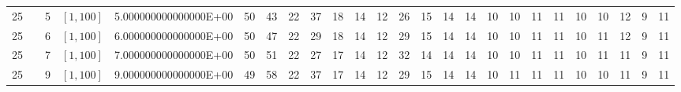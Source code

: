 \documentclass{article}
\begin{document}
\begin{landscape}
\begin{longtable}{ccccccccccccccccccccccccc}
  25 &  & 5          & $[1,100]$ & 5.000000000000000E+00 & \cellcolor{red!75} 50        &\cellcolor{red!5} 43        &\cellcolor{red!5} 22        &\cellcolor{red!5} 37        &\cellcolor{red!5} 18        &\cellcolor{green!5} 14        &\cellcolor{green!5} 12        &\cellcolor{red!5} 26        &15        &\cellcolor{green!5} 14        &\cellcolor{green!5} 14        &\cellcolor{green!5} 10        &\cellcolor{green!5} 10        &\cellcolor{green!5} 11        &\cellcolor{green!5} 11        &\cellcolor{green!5} 10        &\cellcolor{green!5} 10        &\cellcolor{green!5} 12        &\cellcolor{green!75} 9         &\cellcolor{green!5} 11\\
  25 &  & 6          & $[1,100]$ & 6.000000000000000E+00 & \cellcolor{red!75} 50        &\cellcolor{red!5} 47        &\cellcolor{red!5} 22        &\cellcolor{red!5} 29        &\cellcolor{red!5} 18        &\cellcolor{green!5} 14        &\cellcolor{green!5} 12        &\cellcolor{red!5} 29        &15        &\cellcolor{green!5} 14        &\cellcolor{green!5} 14        &\cellcolor{green!5} 10        &\cellcolor{green!5} 10        &\cellcolor{green!5} 11        &\cellcolor{green!5} 11        &\cellcolor{green!5} 10        &\cellcolor{green!5} 11        &\cellcolor{green!5} 12        &\cellcolor{green!75} 9         &\cellcolor{green!5} 11\\
  25 &  & 7          & $[1,100]$ & 7.000000000000000E+00 & \cellcolor{red!5} 50        &\cellcolor{red!75} 51        &\cellcolor{red!5} 22        &\cellcolor{red!5} 27        &17        &\cellcolor{green!5} 14        &\cellcolor{green!5} 12        &\cellcolor{red!5} 32        &\cellcolor{green!5} 14        &\cellcolor{green!5} 14        &\cellcolor{green!5} 14        &\cellcolor{green!5} 10        &\cellcolor{green!5} 10        &\cellcolor{green!5} 11        &\cellcolor{green!5} 11        &\cellcolor{green!5} 10        &\cellcolor{green!5} 11        &\cellcolor{green!5} 11        &\cellcolor{green!75} 9         &\cellcolor{green!5} 11\\
  25 &  & 9          & $[1,100]$ & 9.000000000000000E+00 & \cellcolor{red!5} 49        &\cellcolor{red!75} 58        &\cellcolor{red!5} 22        &\cellcolor{red!5} 37        &17        &\cellcolor{green!5} 14        &\cellcolor{green!5} 12        &\cellcolor{red!5} 29        &15        &\cellcolor{green!5} 14        &\cellcolor{green!5} 14        &\cellcolor{green!5} 10        &\cellcolor{green!5} 11        &\cellcolor{green!5} 11        &\cellcolor{green!5} 11        &\cellcolor{green!5} 10        &\cellcolor{green!5} 10        &\cellcolor{green!5} 11        &\cellcolor{green!75} 9         &\cellcolor{green!5} 11\\

\end{longtable}
\end{landscape}
\end{document}
